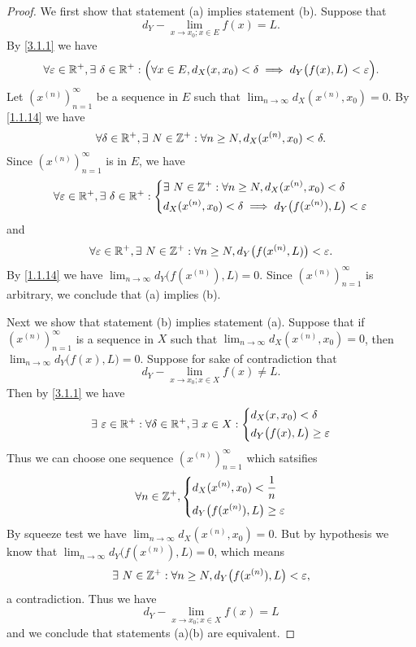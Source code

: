 \begin{proof}
  We first show that statement (a) implies statement (b).
  Suppose that
  \[
    d_Y - \lim_{x \to x_0 ; x \in E} f(x) = L.
  \]
  By \cref{3.1.1} we have
  \[
    \forall \varepsilon \in \mathbb{R}^+, \exists\ \delta \in \mathbb{R}^+ : \Big(\forall x \in E, d_X(x, x_0) < \delta \implies d_Y\big(f(x), L\big) < \varepsilon\Big).
  \]
  Let \((x^{(n)})_{n = 1}^\infty\) be a sequence in \(E\) such that \(\lim_{n \to \infty} d_X(x^{(n)}, x_0) = 0\).
  By \cref{1.1.14} we have
  \[
    \forall \delta \in \mathbb{R}^+, \exists\ N \in \mathbb{Z}^+ : \forall n \geq N, d_X(x^{(n)}, x_0) < \delta.
  \]
  Since \((x^{(n)})_{n = 1}^\infty\) is in \(E\), we have
  \[
    \forall \varepsilon \in \mathbb{R}^+, \exists\ \delta \in \mathbb{R}^+ : \begin{dcases}
      \exists\ N \in \mathbb{Z}^+ : \forall n \geq N, d_X(x^{(n)}, x_0) < \delta \\
      d_X(x^{(n)}, x_0) < \delta \implies d_Y\big(f(x^{(n)}), L\big) < \varepsilon
    \end{dcases}
  \]
  and
  \[
    \forall \varepsilon \in \mathbb{R}^+, \exists\ N \in \mathbb{Z}^+ : \forall n \geq N, d_Y\big(f(x^{(n)}, L)\big) < \varepsilon.
  \]
  By \cref{1.1.14} we have \(\lim_{n \to \infty} d_Y\big(f(x^{(n)}), L\big) = 0\).
  Since \((x^{(n)})_{n = 1}^\infty\) is arbitrary, we conclude that (a) implies (b).

  Next we show that statement (b) implies statement (a).
  Suppose that if \((x^{(n)})_{n = 1}^\infty\) is a sequence in \(X\) such that \(\lim_{n \to \infty} d_X(x^{(n)}, x_0) = 0\), then \(\lim_{n \to \infty} d_Y\big(f(x), L\big) = 0\).
  Suppose for sake of contradiction that
  \[
    d_Y - \lim_{x \to x_0 ; x \in X} f(x) \neq L.
  \]
  Then by \cref{3.1.1} we have
  \[
    \exists\ \varepsilon \in \mathbb{R}^+ : \forall \delta \in \mathbb{R}^+, \exists\ x \in X : \begin{dcases}
      d_X(x, x_0) < \delta \\
      d_Y\big(f(x), L\big) \geq \varepsilon
    \end{dcases}
  \]
  Thus we can choose one sequence \((x^{(n)})_{n = 1}^\infty\) which satsifies
  \[
    \forall n \in \mathbb{Z}^+, \begin{dcases}
      d_X(x^{(n)}, x_0) < \dfrac{1}{n} \\
      d_Y\big(f(x^{(n)}), L\big) \geq \varepsilon
    \end{dcases}
  \]
  By squeeze test we have \(\lim_{n \to \infty} d_X(x^{(n)}, x_0) = 0\).
  But by hypothesis we know that \(\lim_{n \to \infty} d_Y\big(f(x^{(n)}), L\big) = 0\), which means
  \[
    \exists\ N \in \mathbb{Z}^+ : \forall n \geq N, d_Y\big(f(x^{(n)}), L\big) < \varepsilon,
  \]
  a contradiction.
  Thus we have
  \[
    d_Y - \lim_{x \to x_0 ; x \in X} f(x) = L
  \]
  and we conclude that statements (a)(b) are equivalent.


\end{proof}
